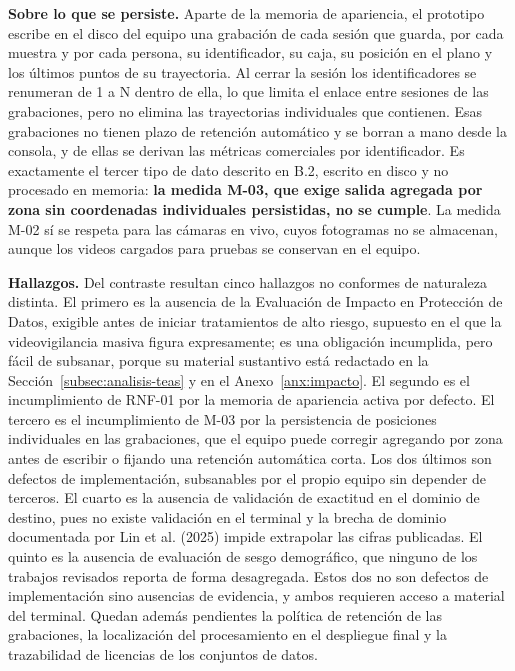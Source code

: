 \textbf{Sobre lo que se persiste.} Aparte de la memoria de apariencia, el
prototipo escribe en el disco del equipo una grabación de cada sesión que
guarda, por cada muestra y por cada persona, su identificador, su caja, su
posición en el plano y los últimos puntos de su trayectoria. Al cerrar la sesión
los identificadores se renumeran de 1 a N dentro de ella, lo que limita el
enlace entre sesiones de las grabaciones, pero no elimina las trayectorias
individuales que contienen. Esas grabaciones no tienen plazo de retención
automático y se borran a mano desde la consola, y de ellas se derivan las
métricas comerciales por identificador. Es exactamente el tercer tipo de dato
descrito en B.2, escrito en disco y no procesado en memoria: \textbf{la medida
M-03, que exige salida agregada por zona sin coordenadas individuales
persistidas, no se cumple}. La medida M-02 sí se respeta para las cámaras en
vivo, cuyos fotogramas no se almacenan, aunque los videos cargados para
pruebas se conservan en el equipo.

\textbf{Hallazgos.} Del contraste resultan cinco hallazgos no conformes de
naturaleza distinta. El primero es la ausencia de la Evaluación de Impacto en
Protección de Datos, exigible antes de iniciar tratamientos de alto riesgo,
supuesto en el que la videovigilancia masiva figura expresamente; es una
obligación incumplida, pero fácil de subsanar, porque su material sustantivo
está redactado en la Sección~\ref{subsec:analisis-teas} y en el
Anexo~\ref{anx:impacto}. El segundo es el incumplimiento de RNF-01 por la
memoria de apariencia activa por defecto. El tercero es el incumplimiento de
M-03 por la persistencia de posiciones individuales en las grabaciones, que el
equipo puede corregir agregando por zona antes de escribir o fijando una
retención automática corta. Los dos últimos son defectos de implementación,
subsanables por el propio equipo sin depender de terceros. El cuarto es la
ausencia de validación de exactitud en el dominio de destino, pues no existe
validación en el terminal y la brecha de dominio documentada por Lin et al.
(2025) impide extrapolar las cifras publicadas. El quinto es la ausencia de
evaluación de sesgo demográfico, que ninguno de los trabajos revisados reporta
de forma desagregada. Estos dos no son defectos de implementación sino
ausencias de evidencia, y ambos requieren acceso a material del terminal.
Quedan además pendientes la política de retención de las grabaciones, la
localización del procesamiento en el despliegue final y la trazabilidad de
licencias de los conjuntos de datos.

